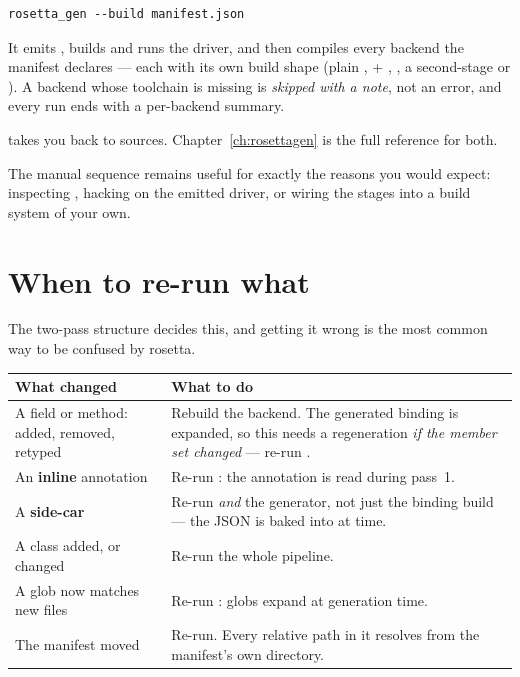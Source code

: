 \begin{lstlisting}[style=sh]
rosetta_gen --build manifest.json
\end{lstlisting}

It emits , builds and runs the driver, and then compiles every
backend the manifest declares --- each with its own build shape (plain
,  + , , a
second-stage  or ). A backend whose
toolchain is missing is \emph{skipped with a note}, not an error, and every run
ends with a per-backend summary.

 takes you back to sources. Chapter~\ref{ch:rosettagen}
is the full reference for both.

The manual sequence remains useful for exactly the reasons you would expect:
inspecting , hacking on the emitted driver, or wiring the
stages into a build system of your own.

\section{When to re-run what}

The two-pass structure decides this, and getting it wrong is the most common
way to be confused by rosetta.

\begin{center}
\small
\begin{tabular}{@{}L{6.2cm}L{7.4cm}@{}}
\toprule
\textbf{What changed} & \textbf{What to do} \\
\midrule
A field or method: added, removed, retyped &
  Rebuild the backend. The generated binding is expanded, so this needs a
  regeneration \emph{if the member set changed} --- re-run . \\
\addlinespace
An \textbf{inline} annotation &
  Re-run : the annotation is read during pass~1. \\
\addlinespace
A \textbf{side-car}  &
  Re-run  \emph{and} the generator, not just the binding
  build --- the JSON is baked into  at 
  time. \\
\addlinespace
A class added, or  changed &
  Re-run the whole pipeline. \\
\addlinespace
A  glob now matches new files &
  Re-run : globs expand at generation time. \\
\addlinespace
The manifest moved &
  Re-run. Every relative path in it resolves from the manifest's own directory. \\
\bottomrule
\end{tabular}
\end{center}

